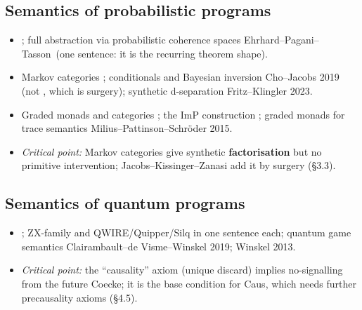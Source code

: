 \documentclass[11pt,a4paper]{article}
\newif\ifskeletonnotes
\newcommand{\budget}[1]{\ifskeletonnotes{\small\color{red!60!black}\textbf{(\textasciitilde#1 words)}}\fi}
\newcommand{\sknew}[1]{\ifskeletonnotes{\color{purple!70!black}[NEW: #1]}\else#1\fi}
\newcommand{\skim}{\ifskeletonnotes{\color{purple!70!black}[SKIM]}\fi}
\begin{document}
\subsection{Semantics of probabilistic programs}\budget{300}
\begin{itemize}[nosep]
\item \cite{kock72,semantics_ppl_staton2016,Heunen_2017,vandemeent2021introductionprobabilisticprogramming,lazyppl,monadbayes1,monadbayes2,becker26genjax}; full abstraction via probabilistic coherence spaces \sknew{Ehrhard--Pagani--Tasson}\skim\ (one sentence: it is the recurring theorem shape).
\item Markov categories \cite{fritz2020synthetic,fritz2019probability}; conditionals and Bayesian inversion \sknew{Cho--Jacobs 2019} (not \cite{jacobs2019causal}, which is surgery); synthetic d-separation \sknew{Fritz--Klingler 2023}.
\item Graded monads and categories \cite{katsumata2014_graded_strong_monad,orchard2020unifying,fujii2016towards,dorsch2019graded,sarkis2025string,levy2019locallygraded}; the ImP construction \cite{liell2025compositional}; graded monads for trace semantics \sknew{Milius--Pattinson--Schr\"oder 2015}\skim.
\item \emph{Critical point:} Markov categories give synthetic \textbf{factorisation} but no primitive intervention; Jacobs--Kissinger--Zanasi add it by surgery (\S3.3).
\end{itemize}
\subsection{Semantics of quantum programs}\budget{200}
\begin{itemize}[nosep]
\item \cite{QPL_SELINGER_2004,selinger_dagger_compact_closed_cat_cp_maps,SemOperatorAlgebra,abramsky2007categoricalsemanticsquantumprotocols,heunen_vicary_book,PQP_Coecke_Kissinger_2017,statonpopl15,Quantum_PI_Carette_2024,PaganiSV13,D_Completion_ZHAO20102167,sati2023quantummonadology,QIO_Altenkirch_Green_2009}; ZX-family and QWIRE/Quipper/Silq in one sentence each; quantum game semantics \sknew{Clairambault--de Visme--Winskel 2019; Winskel 2013}\skim.
\item \emph{Critical point:} the ``causality'' axiom (unique discard) implies no-signalling from the future \sknew{Coecke}; it is the base condition for Caus, which needs further precausality axioms (\S4.5).
\end{itemize}
\end{document}
